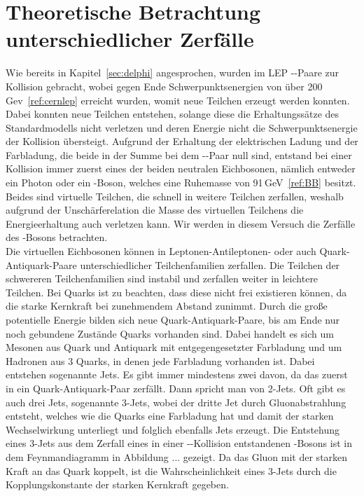 \documentclass[a4paper,ngerman]{scrartcl}
\begin{document}
\section{Theoretische Betrachtung unterschiedlicher Zerfälle}
\label{sec:zerfaelle}

Wie bereits in Kapitel~\ref{sec:delphi} angesprochen, wurden im LEP \Pelectron-\APelectron-Paare zur Kollision gebracht, wobei gegen Ende Schwerpunktsenergien von über 200\,Gev~\ref{ref:cernlep} erreicht wurden,
womit neue Teilchen erzeugt werden konnten.
Dabei konnten neue Teilchen entstehen, 
solange diese die Erhaltungssätze des Standardmodells nicht verletzen 
und deren Energie nicht die Schwerpunktsenergie der Kollision übersteigt.
Aufgrund der Erhaltung der elektrischen Ladung und der Farbladung, 
die beide in der Summe bei dem \Pelectron-\APelectron-Paar null sind,
entstand bei einer Kollision immer zuerst eines der beiden neutralen Eichbosonen,
nämlich entweder ein Photon oder ein \PZzero-Boson,
welches eine Ruhemasse von 91\,GeV~\ref{ref:BB} besitzt.
Beides sind virtuelle Teilchen, die schnell in weitere Teilchen zerfallen,
weshalb aufgrund der Unschärferelation die Masse des virtuellen
Teilchens die Energieerhaltung auch verletzen kann.
Wir werden in diesem Versuch die Zerfälle des \PZzero-Bosons betrachten.\\

Die virtuellen Eichbosonen können in Leptonen-Antileptonen- oder auch 
Quark-Antiquark-Paare unterschiedlicher Teilchenfamilien zerfallen. 
Die Teilchen der schwereren Teilchenfamilien sind instabil und zerfallen weiter in leichtere Teilchen.
Bei Quarks ist zu beachten, dass diese nicht frei existieren können,
da die starke Kernkraft bei zunehmendem Abstand zunimmt.
Durch die große potentielle Energie bilden sich neue Quark-Antiquark-Paare,
bis am Ende nur noch gebundene Zustände Quarks vorhanden sind. 
Dabei handelt es sich um 
Mesonen aus Quark und Antiquark mit entgegengesetzter Farbladung und um Hadronen aus 3 Quarks,
in denen jede Farbladung vorhanden ist. 
Dabei entstehen sogenannte Jets. 
Es gibt immer mindestens zwei davon, da das \PZzero zuerst in ein Quark-Antiquark-Paar zerfällt. 
Dann spricht man von 2-Jets.
Oft gibt es auch drei Jets, sogenannte 3-Jets, wobei der dritte Jet durch Gluonabstrahlung entsteht,
welches wie die Quarks eine Farbladung hat und damit der starken Wechselwirkung unterliegt und folglich ebenfalls Jets erzeugt.
Die Entstehung eines 3-Jets aus dem Zerfall eines in einer \Pelectron-\APelectron-Kollision entstandenen \PZzero-Bosons ist 
in dem Feynmandiagramm in Abbildung ... gezeigt.
Da das Gluon mit der starken Kraft an das Quark koppelt, ist die Wahrscheinlichkeit eines 3-Jets durch die 
Kopplungskonstante der starken Kernkraft gegeben.
\end{document}
